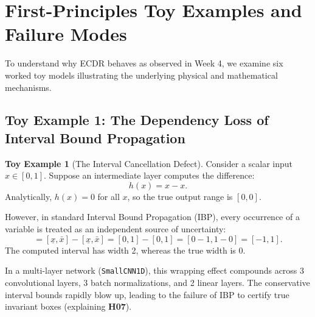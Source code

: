\documentclass[11pt,article]{article}
\theoremstyle{definition}
\newtheorem{toyexample}{Toy Example}
\begin{document}
\section{First-Principles Toy Examples and Failure Modes}

To understand why ECDR behaves as observed in Week 4, we examine six worked toy models illustrating the underlying physical and mathematical mechanisms.

\subsection{Toy Example 1: The Dependency Loss of Interval Bound Propagation}
\begin{toyexample}[The Interval Cancellation Defect]
Consider a scalar input $x \in [0, 1]$. Suppose an intermediate layer computes the difference:
\begin{equation}
h(x) = x - x.
\end{equation}
Analytically, $h(x) = 0$ for all $x$, so the true output range is $[0, 0]$.

However, in standard Interval Bound Propagation (IBP), every occurrence of a variable is treated as an independent source of uncertainty:
\begin{equation}
[\underline{h}, \bar{h}] = [\underline{x}, \bar{x}] - [\underline{x}, \bar{x}] = [0, 1] - [0, 1] = [0 - 1, 1 - 0] = [-1, 1].
\end{equation}
The computed interval has width 2, whereas the true width is 0. 

In a multi-layer network (\texttt{SmallCNN1D}), this wrapping effect compounds across 3 convolutional layers, 3 batch normalizations, and 2 linear layers. The conservative interval bounds rapidly blow up, leading to the failure of IBP to certify true invariant boxes (explaining \textbf{H07}).
\end{toyexample}
\end{document}
